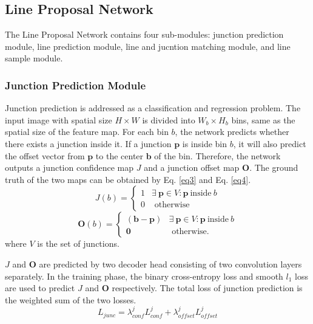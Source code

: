 \documentclass[letterpaper, 10 pt, conference]{ieeeconf}
\begin{document}
\subsection{Line Proposal Network} \label{sec3-4}
The Line Proposal Network contains four sub-modules: junction prediction module, line prediction module, line and jucntion matching module, and line sample module.

\subsubsection{\textbf{Junction Prediction Module}} \label{sec3-4-1}
Junction prediction is addressed as a classification and regression problem. The input image with spatial size $H \times W$ is divided into $W_b \times H_b$ bins, same as the spatial size of the feature map. For each bin $b$, the network predicts whether there exists a junction inside it. If a junction $\boldsymbol{p}$ is inside bin $b$, it will also predict the offset vector from $\boldsymbol{p}$ to the center $\boldsymbol{b}$ of the bin. Therefore, the network outputs a junction confidence map $J$ and a junction offset map $\boldsymbol{O}$. The ground truth of the two maps can be obtained by Eq. \ref{eq3} and Eq. \ref{eq4}.
\begin{equation} \label{eq3}
	J(b)=\left\{\begin{array}{cl}
		1 & \exists \ \boldsymbol{p} \in {V}: \boldsymbol{p} \ \text{inside} \ b \\
		0 & \text { otherwise }
	\end{array}\right.
\end{equation}
\begin{equation} \label{eq4}
	\mathbf{O}(b)=\left\{\begin{array}{cl}
		\left(\boldsymbol{b}-\boldsymbol{p}\right) & \exists \ \boldsymbol{p} \in {V}: \boldsymbol{p} \ \text{inside} \ b \\
		\boldsymbol{0} & \text { otherwise. }
	\end{array}\right.
\end{equation}
where $V$ is the set of junctions.

$J$ and $\boldsymbol{O}$ are predicted by two decoder head consisting of two convolution layers separately. In the training phase, the binary cross-entropy loss and smooth $l_1$ loss are used to predict $J$ and $\boldsymbol{O}$ respectively. The total loss of junction prediction is the weighted sum of the two losses.
\begin{equation} \label{eq5}
	L_{junc}=\lambda_{conf}^{j} L_{conf}^{j}+\lambda_{offset}^{j} L_{offset}^{j}
\end{equation}
\end{document}
